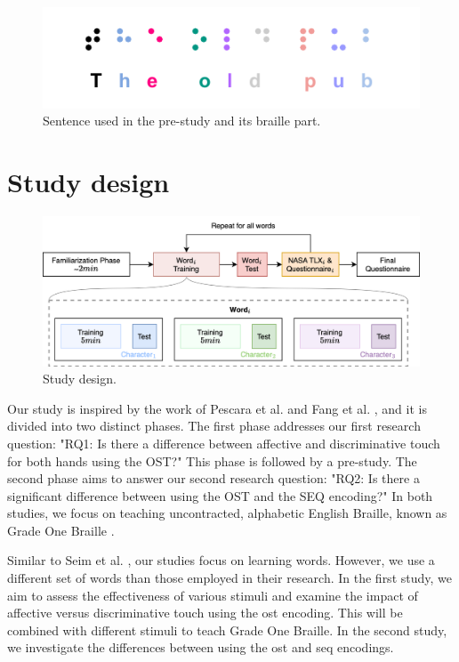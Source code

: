 \begin{figure}
    \centering
    \includegraphics[width=.75\linewidth]{src/pictures/braille_prestudy_characters.drawio.pdf}
    \caption{Sentence used in the pre-study and its braille part.}
    \label{fig:braille_prestudy_characters}
\end{figure}
 











 \section{Study design}

\begin{figure}
    \centering
    \includegraphics[width=0.75\linewidth]{src/pictures/StudyData/Study_design.drawio.png}
    \caption{Study design.}
    \label{fig:study-design}
\end{figure}

Our study is inspired by the work of Pescara et al. \cite{Pescara2019} and Fang et al. \cite{Fang2023}, and it is divided into two distinct phases. The first phase addresses our first research question: "RQ1: Is there a difference between affective and discriminative touch for both hands using the OST?" This phase is followed by a pre-study. The second phase aims to answer our second research question: "RQ2: Is there a significant difference between using the OST and the SEQ encoding?" In both studies, we focus on teaching uncontracted, alphabetic English Braille, known as Grade One Braille \cite{Troughton1992, Alnfiai2017}.

Similar to Seim et al. \cite{Seim2016, Seim2018}, our studies focus on learning words. However, we use a different set of words than those employed in their research. In the first study, we aim to assess the effectiveness of various stimuli and examine the impact of affective versus discriminative touch using the \gls{ost} encoding. This will be combined with different stimuli to teach Grade One Braille. In the second study, we investigate the differences between using the \gls{ost} and \gls{seq} encodings.

